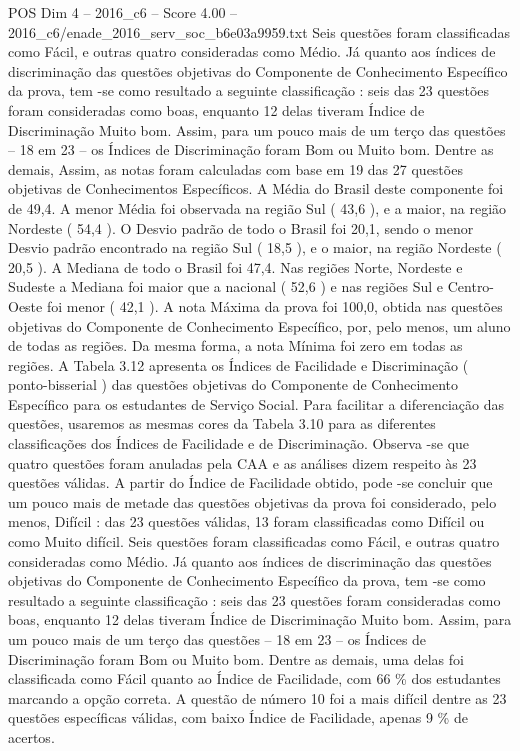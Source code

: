 \begin{textsample}{POS Dim 4 – 2016\_c6 – Score 4.00 – 2016\_c6/enade\_2016\_serv\_soc\_b6e03a9959.txt}
Seis questões foram classificadas como Fácil, e outras quatro consideradas como Médio.
Já quanto aos índices de discriminação das questões objetivas do Componente de Conhecimento Específico da prova, tem -se como resultado a seguinte classificação : seis das 23 questões foram consideradas como boas, enquanto 12 delas tiveram Índice de Discriminação Muito bom.
Assim, para um pouco mais de um terço das questões – 18 em 23 – os Índices de Discriminação foram Bom ou Muito bom.
Dentre as demais, Assim, as notas foram calculadas com base em 19 das 27 questões objetivas de Conhecimentos Específicos.
A Média do Brasil deste componente foi de 49,4.
A menor Média foi observada na região Sul ( 43,6 ), e a maior, na região Nordeste ( 54,4 ).
O Desvio padrão de todo o Brasil foi 20,1, sendo o menor Desvio padrão encontrado na região Sul ( 18,5 ), e o maior, na região Nordeste ( 20,5 ).
A Mediana de todo o Brasil foi 47,4.
Nas regiões Norte, Nordeste e Sudeste a Mediana foi maior que a nacional ( 52,6 ) e nas regiões Sul e Centro-Oeste foi menor ( 42,1 ).
A nota Máxima da prova foi 100,0, obtida nas questões objetivas do Componente de Conhecimento Específico, por, pelo menos, um aluno de todas as regiões.
Da mesma forma, a nota Mínima foi zero em todas as regiões.
A Tabela 3.12 apresenta os Índices de Facilidade e Discriminação ( ponto-bisserial ) das questões objetivas do Componente de Conhecimento Específico para os estudantes de Serviço Social.
Para facilitar a diferenciação das questões, usaremos as mesmas cores da Tabela 3.10 para as diferentes classificações dos Índices de Facilidade e de Discriminação.
Observa -se que quatro questões foram anuladas pela CAA e as análises dizem respeito às 23 questões válidas.
A partir do Índice de Facilidade obtido, pode -se concluir que um pouco mais de metade das questões objetivas da prova foi considerado, pelo menos, Difícil : das 23 questões válidas, 13 foram classificadas como Difícil ou como Muito difícil.
Seis questões foram classificadas como Fácil, e outras quatro consideradas como Médio.
Já quanto aos índices de discriminação das questões objetivas do Componente de Conhecimento Específico da prova, tem -se como resultado a seguinte classificação : seis das 23 questões foram consideradas como boas, enquanto 12 delas tiveram Índice de Discriminação Muito bom.
Assim, para um pouco mais de um terço das questões – 18 em 23 – os Índices de Discriminação foram Bom ou Muito bom.
Dentre as demais, uma delas foi classificada como Fácil quanto ao Índice de Facilidade, com 66 \% dos estudantes marcando a opção correta.
A questão de número 10 foi a mais difícil dentre as 23 questões específicas válidas, com baixo Índice de Facilidade, apenas 9 \% de acertos.

\end{textsample}
